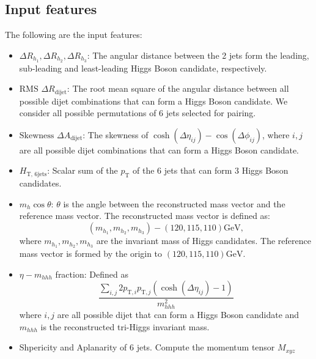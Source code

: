 \documentclass[12pt]{article}
\begin{document}
    \subsection{Input features}%
    \label{sub:input_features}
        The following are the input features:
        \begin{itemize}
            \item $\Delta R_{h_1}, \Delta R_{h_2}, \Delta R_{h_3}$: The angular distance between the 2 jets form the leading, sub-leading and least-leading Higgs Boson candidate, respectively.
            \item $\text{RMS } \Delta R_{\text{dijet}}$: The root mean square of the angular distance between all possible dijet combinations that can form a Higgs Boson candidate. We consider all possible permutations of 6 jets selected for pairing.
            \item $\text{Skewness } \Delta A_{\text{dijet}}$: The skewness of $\cosh\left( \Delta\eta_{ij} \right) - \cos\left( \Delta\phi_{ij} \right) $, where $i,j$ are all possible dijet combinations that can form a Higgs Boson candidate.
            \item $H_{\text{T, 6jets}}$: Scalar sum of the $p_{\text{T}}$ of the 6 jets that can form 3 Higgs Boson candidates.
            \item $m_{h}\cos\theta$: $\theta$ is the angle between the reconstructed mass vector and the reference mass vector. The reconstructed mass vector is defined as:
                \begin{equation}
                    \left( m_{h_1}, m_{h_2}, m_{h_3} \right) - \left( 120, 115, 110 \right) \text{GeV},
                \end{equation}
                where $m_{h_1}, m_{h_2}, m_{h_3}$ are the invariant mass of Higgs candidates. The reference mass vector is formed by the origin to $\left( 120, 115, 110 \right) \text{GeV}$.
            \item $\eta - m_{hhh}$ fraction: Defined as
            \begin{equation}
            \frac{\sum_{i,j} 2 p_{\text{T},i} p_{\text{T},j} \left( \cosh\left( \Delta\eta_{ij} \right) -1 \right) }{m_{hhh}^2}
            \end{equation}
            where $i,j$ are all possible dijet that can form a Higgs Boson candidate and $m_{hhh}$ is the reconstructed tri-Higgs invariant mass.
            \item Shpericity and Aplanarity of 6 jets. Compute the momentum tensor $M_{xyz}$ 

\end{itemize}
\end{document}
